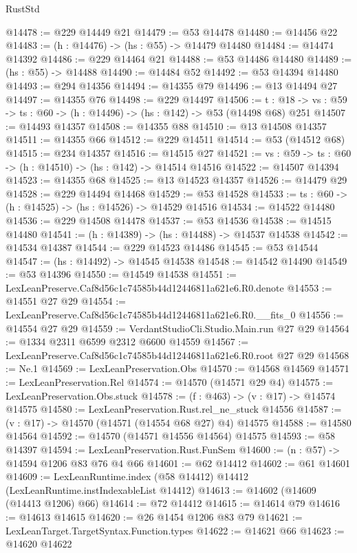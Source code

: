 \begin{lexlean}{RustStd}
\begin{coremodule}
@14478 := @229 @14449 @21
@14479 := @53 @14478
@14480 := @14456 @22
@14483 := (h : @14476) -> (hs : @55) -> @14479 @14480
@14484 := @14474 @14392
@14486 := @229 @14464 @21
@14488 := @53 @14486 @14480
@14489 := (hs : @55) -> @14488
@14490 := @14484 @52
@14492 := @53 @14394 @14480
@14493 := @294 @14356
@14494 := @14355 @79
@14496 := @13 @14494 @27
@14497 := @14355 @76
@14498 := @229 @14497
@14506 := {t : @18} ->
  {vs : @59} -> {ts : @60} -> (h : @14496) -> (hs : @142) -> @53 (@14498 @68) @251
@14507 := @14493 @14357
@14508 := @14355 @88
@14510 := @13 @14508 @14357
@14511 := @14355 @66
@14512 := @229 @14511
@14514 := @53 (@14512 @68)
@14515 := @234 @14357
@14516 := @14515 @27
@14521 := {vs : @59} -> {ts : @60} -> (h : @14510) -> (hs : @142) -> @14514 @14516
@14522 := @14507 @14394
@14523 := @14355 @68
@14525 := @13 @14523 @14357
@14526 := @14479 @29
@14528 := @229 @14494 @14468
@14529 := @53 @14528
@14533 := {ts : @60} -> (h : @14525) -> (hs : @14526) -> @14529 @14516
@14534 := @14522 @14480
@14536 := @229 @14508 @14478
@14537 := @53 @14536
@14538 := @14515 @14480
@14541 := (h : @14389) -> (hs : @14488) -> @14537 @14538
@14542 := @14534 @14387
@14544 := @229 @14523 @14486
@14545 := @53 @14544
@14547 := (hs : @14492) -> @14545 @14538
@14548 := @14542 @14490
@14549 := @53 @14396
@14550 := @14549 @14538
@14551 := LexLeanPreserve.Caf8d56c1c74585b44d12446811a621e6.R0.denote
@14553 := @14551 @27 @29
@14554 := LexLeanPreserve.Caf8d56c1c74585b44d12446811a621e6.R0.__fits_0
@14556 := @14554 @27 @29
@14559 := VerdantStudioCli.Studio.Main.run @27 @29
@14564 := @1334 @2311 @6599 @2312 @6600 @14559
@14567 := LexLeanPreserve.Caf8d56c1c74585b44d12446811a621e6.R0.root @27 @29
@14568 := Ne.{1}
@14569 := LexLeanPreservation.Obs
@14570 := @14568 @14569
@14571 := LexLeanPreservation.Rel
@14574 := @14570 (@14571 @29 @4)
@14575 := LexLeanPreservation.Obs.stuck
@14578 := (f : @463) -> (v : @17) -> @14574 @14575
@14580 := LexLeanPreservation.Rust.rel_ne_stuck @14556
@14587 := (v : @17) -> @14570 (@14571 (@14554 @68 @27) @4) @14575
@14588 := @14580 @14564
@14592 := @14570 (@14571 @14556 @14564) @14575
@14593 := @58 @14397
@14594 := LexLeanPreservation.Rust.FunSem
@14600 := (n : @57) -> @14594 @1206 @83 @76 @4 @66
@14601 := @62 @14412
@14602 := @61 @14601
@14609 := LexLeanRuntime.index (@58 @14412) @14412 (LexLeanRuntime.instIndexableList @14412)
@14613 := @14602 (@14609 (@14413 @1206) @66)
@14614 := @72 @14412
@14615 := @14614 @79
@14616 := @14613 @14615
@14620 := @26 @1454 @1206 @83 @79
@14621 := LexLeanTarget.TargetSyntax.Function.types
@14622 := @14621 @66
@14623 := @14620 @14622

\end{coremodule}
\end{lexlean}
